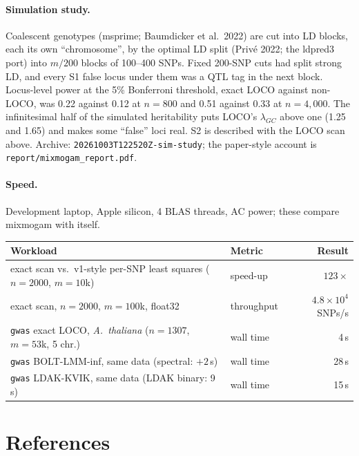 \documentclass[11pt]{article}
\begin{document}
\paragraph{Simulation study.} Coalescent genotypes (msprime; Baumdicker
et al.\ 2022) are cut into LD blocks, each its own ``chromosome'', by the
optimal LD split (Priv\'e 2022; the ldpred3 port) into $m/200$ blocks of
100--400 SNPs. Fixed 200-SNP cuts had split strong LD, and every S1 false
locus under them was a QTL tag in the next block. Locus-level power at
the 5\% Bonferroni threshold, exact LOCO against non-LOCO, was 0.22 against
0.12 at $n = 800$ and 0.51 against 0.33 at $n = 4{,}000$. The infinitesimal
half of the simulated heritability puts LOCO's $\lambda_{GC}$ above one
(1.25 and 1.65) and makes some ``false'' loci real. S2 is described with
the LOCO scan above. Archive: \texttt{20261003T122520Z-sim-study}; the
paper-style account is \texttt{report/mixmogam\_report.pdf}.

\paragraph{Speed.} Development laptop, Apple silicon, 4 BLAS threads, AC
power; these compare mixmogam with itself.

\begin{center}
\small
\setlength{\tabcolsep}{4.5pt}
\begin{tabular}{@{}llr@{}}
\toprule
Workload & Metric & Result \\
\midrule
exact scan vs.\ v1-style per-SNP least squares ($n{=}2000$, $m{=}10$k) & speed-up & $123\times$ \\
exact scan, $n{=}2000$, $m{=}100$k, float32 & throughput & $4.8\times10^{4}$ SNPs/s \\
\texttt{gwas} exact LOCO, \emph{A.\ thaliana} ($n{=}1307$, $m{=}53$k, 5 chr.) & wall time & 4\,s \\
\texttt{gwas} BOLT-LMM-inf, same data (spectral: $+2$\,s) & wall time & 28\,s \\
\texttt{gwas} LDAK-KVIK, same data (LDAK binary: 9\,s) & wall time & 15\,s \\
\bottomrule
\end{tabular}
\end{center}

\section{References}
\end{document}
